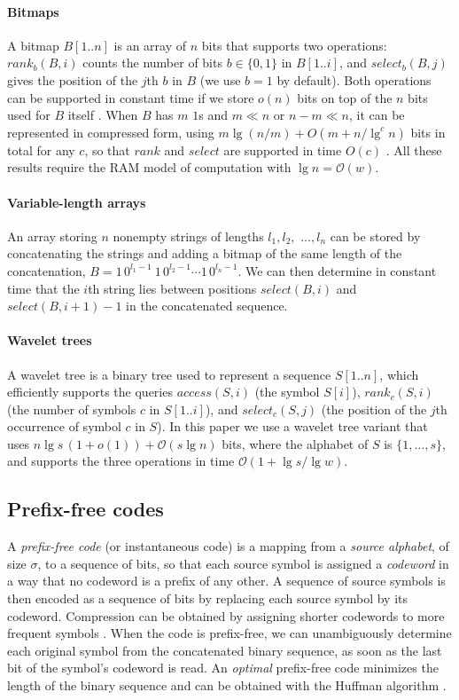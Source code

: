\documentclass[preprint,12pt]{elsarticle}
\newcommand{\Oh}[1]{\ensuremath{\mathcal{O}\!\left({#1}\right)}}
\renewcommand{\log}{\lg}
\begin{document}
\paragraph{Bitmaps}
A bitmap $B[1..n]$ is an array of $n$ bits that supports two operations:
$rank_b(B,i)$ counts the number of bits $b \in \{0,1\}$ in $B[1..i]$, and 
$select_b(B,j)$ gives the position of the $j$th $b$ in $B$ (we use $b=1$ by
default). Both operations can be supported in constant time if we store $o(n)$ 
bits on top of the $n$ bits used for $B$ itself \cite{Cla96,Mun96}. When $B$ 
has $m$ $1$s and $m \ll n$ or $n-m \ll n$, it can be represented
in compressed form, using $m\log(n/m) + O(m+n/\log^c n)$ bits in total for any 
$c$, so that $rank$ and $select$ are supported in time $O(c)$ \cite{Pat08}.
All these results require the RAM model of computation with $\log n = \Oh{w}$.

\paragraph{Variable-length arrays} An array storing $n$ nonempty strings of 
lengths $l_1,l_2,$ $\ldots,l_n$ can be stored by concatenating the strings and 
adding a bitmap of the same
length of the concatenation, $B = 1\,0^{l_1-1}~1\,0^{l_2-1}\cdots 1\,0^{l_n-1}$.
We can then determine in constant time that
the $i$th string lies between positions $select(B,i)$ and $select(B,i+1)-1$ 
in the concatenated sequence.

\paragraph{Wavelet trees}
A wavelet tree \cite{GGV03} is a binary tree used to represent a sequence
$S[1..n]$, which efficiently supports the queries $access(S,i)$ (the symbol
$S[i]$), $rank_c(S,i)$ (the number of symbols $c$ in $S[1..i]$), and 
$select_c(S,j)$ (the position of the $j$th occurrence of symbol $c$ in $S$).
In this paper we use a wavelet tree variant \cite{BN12} that
uses $n\lg s\,(1+o(1)) + \Oh{s\lg n}$ bits, where the alphabet of $S$ is
$\{1,\ldots,s\}$, and supports the three operations in time 
$\Oh{1+\lg s / \lg w}$.


\subsection{Prefix-free codes}
\label{sec:prefix}

A {\em prefix-free code} (or instantaneous code) is a mapping from a {\em 
source alphabet}, of size $\sigma$, to a sequence of bits, so that each source 
symbol is assigned a {\em codeword} in a way that no codeword is a prefix of 
any other. A sequence of source symbols is then encoded as a sequence of bits 
by replacing each source symbol by its codeword. Compression can be obtained 
by assigning shorter codewords to more frequent symbols \cite[Ch.\ 5]{CT06}.
When the code is prefix-free, we can unambiguously determine each original 
symbol from the concatenated binary sequence, as soon as the last bit of the
symbol's codeword is read. An {\em optimal} prefix-free code minimizes the 
length of the binary sequence and can be obtained with the Huffman algorithm 
\cite{Huf52}.
\end{document}
